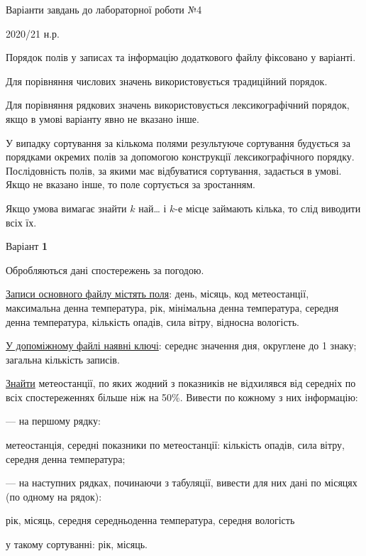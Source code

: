 \documentclass[11pt, ukrainian]{article}
\begin{document}
{\Large \center  Варіанти завдань до лабораторної роботи №4\par 2020/21 н.р.\par \bigskip\bigskip}

Порядок полів у записах та інформацію додаткового файлу фіксовано у варіанті.

Для порівняння числових значень використовується традиційний порядок.

Для порівняння рядкових значень використовується лексикографічний порядок, якщо в умові варіанту явно не вказано інше. 

У випадку сортування за кількома полями результуюче сортування будується 
за порядками окремих полів за допомогою конструкції лексикографічного порядку. 
Послідовність полів, за якими має відбуватися сортування, задається в умові. 
Якщо не вказано інше, то поле сортується за зростанням.

Якщо умова вимагає знайти $k$ най… і $k$-е місце займають кілька, то слід виводити всіх їх.

\newpage
\par \bigskip

{\center Варіант  \No \textbf { 1 }\par}
\bigskip
Обробляються дані спостережень за погодою. 

\underline{Записи основного файлу містять поля}: день, місяць, код метеостанції, максимальна денна температура, рік, мінімальна денна температура, середня денна температура, кількість опадів, сила вітру, відносна вологість.

\underline{У допоміжному файлі наявні ключі}: середнє значення дня, округлене до 1 знаку; загальна кількість записів.

\underline{Знайти} метеостанції, по яких жодний з показників не відхилявся від середніх по всіх спостереженнях більше ніж на 50\%. Вивести по кожному з них інформацію:\par
{\noindent}--- на першому рядку:\par
метеостанція, середні показники по метеостанції: кількість опадів, сила вітру, середня денна температура;

{\noindent}--- на наступних рядках, починаючи з табуляції, вивести для них дані по місяцях (по одному на рядок):\par
рік, місяць, середня середньоденна температура, середня вологість

{\noindent}у такому сортуванні: рік, місяць.

\end{document}
